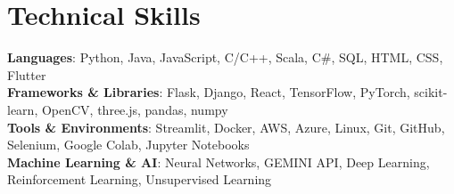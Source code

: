 \documentclass[letterpaper,10pt]{article}
\begin{document}
\section{Technical Skills}
 \begin{itemize}[leftmargin=0.15in, label={}]
    \small{\item{
     \textbf{Languages}{: Python, Java, JavaScript, C/C++, Scala, C\#, SQL, HTML, CSS, Flutter} \\
     \textbf{Frameworks \& Libraries}{: Flask, Django, React, TensorFlow, PyTorch, scikit-learn, OpenCV, three.js, pandas, numpy} \\
     \textbf{Tools \& Environments}{: Streamlit, Docker, AWS, Azure, Linux, Git, GitHub, Selenium, Google Colab, Jupyter Notebooks} \\
     \textbf{Machine Learning \& AI}{: Neural Networks, GEMINI API, Deep Learning, Reinforcement Learning, Unsupervised Learning} \\
    }}
 \end{itemize}
\end{document}
